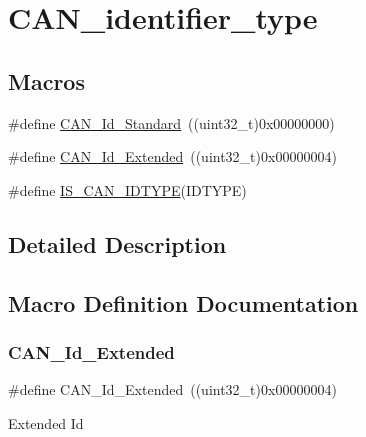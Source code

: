 \hypertarget{group___c_a_n__identifier__type}{}\section{C\+A\+N\+\_\+identifier\+\_\+type}
\label{group___c_a_n__identifier__type}
\subsection*{Macros}
\begin{DoxyCompactItemize}
\item 
\#define \mbox{\hyperlink{group___c_a_n__identifier__type_ga151d9df8a6f361d0a3231593726b5a13}{C\+A\+N\+\_\+\+Id\+\_\+\+Standard}}~((uint32\+\_\+t)0x00000000)
\item 
\#define \mbox{\hyperlink{group___c_a_n__identifier__type_gaf6c5c0b43b968fed17fd90246912b1a7}{C\+A\+N\+\_\+\+Id\+\_\+\+Extended}}~((uint32\+\_\+t)0x00000004)
\item 
\#define \mbox{\hyperlink{group___c_a_n__identifier__type_gab845f7fbcf6ff8cf3d025210eb8900e4}{I\+S\+\_\+\+C\+A\+N\+\_\+\+I\+D\+T\+Y\+PE}}(I\+D\+T\+Y\+PE)
\end{DoxyCompactItemize}


\subsection{Detailed Description}


\subsection{Macro Definition Documentation}
\mbox{\label{group___c_a_n__identifier__type_gaf6c5c0b43b968fed17fd90246912b1a7}} 
\subsubsection{\texorpdfstring{CAN\_Id\_Extended}{CAN\_Id\_Extended}}
{\footnotesize\ttfamily \#define C\+A\+N\+\_\+\+Id\+\_\+\+Extended~((uint32\+\_\+t)0x00000004)}

Extended Id \mbox{\label{group___c_a_n__identifier__type_ga151d9df8a6f361d0a3231593726b5a13}} 
